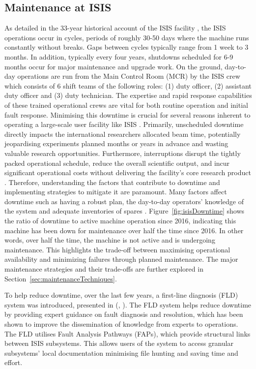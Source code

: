 \documentclass[10pt,oneside]{report}
\renewcommand{\citet}[1]{\citeauthor{#1}, \citeyear{#1}}
\begin{document}
\subsection{Maintenance at ISIS} 
As detailed in the 33-year historical account of the ISIS facility \cite{thomason2019isis}, the ISIS operations occur in cycles, periods of roughly 30-50 days where the machine runs constantly without breaks. Gaps between cycles typically range from 1 week to 3 months. In addition, typically every four years, shutdowns scheduled for 6-9 months occur for major maintenance and upgrade work. On the ground, day-to-day operations are run from the Main Control Room (MCR) by the ISIS crew which consists of 6 shift teams of the following roles: (1) duty officer, (2) assistant duty officer and (3) duty technician. The expertise and rapid response capabilities of these trained operational crews are vital for both routine operation and initial fault response.
Minimising this downtime is crucial for several reasons inherent to operating a large-scale user facility like ISIS \cite{thomason2019isis}. Primarily, unscheduled downtime directly impacts the international researchers allocated beam time, potentially jeopardising experiments planned months or years in advance and wasting valuable research opportunities. Furthermore, interruptions disrupt the tightly packed operational schedule, reduce the overall scientific output, and incur significant operational costs without delivering the facility's core research product \cite{thomason2019isis}. Therefore, understanding the factors that contribute to downtime and implementing strategies to mitigate it are paramount.
Many factors affect downtime such as having a robust plan, the day-to-day operators' knowledge of the system and adequate inventories of spares \cite{thomason2019isis}. Figure~\ref{fig:isisDowntime} shows the ratio of downtime to active machine operation since 2016, indicating this machine has been down for maintenance over half the time since 2016. In other words, over half the time, the machine is not active and is undergoing maintenance. This highlights the trade-off between maximising operational availability and minimizing failures through planned maintenance. The major maintenance strategies and their trade-offs are further explored in Section~\ref{sec:maintenanceTechniques}.

To help reduce downtime, over the last few years, a first-line diagnosis (FLD) system was introduced, presented in (\citet{fld2017}). The FLD system helps reduce downtime by providing expert guidance on fault diagnosis and resolution, which has been shown to improve the dissemination of knowledge from experts to operations. The FLD utilises Fault Analysis Pathways (FAPs), which provide structural links between ISIS subsystems. This allows users of the system to access granular subsystems' local documentation minimising file hunting and saving time and effort. 
\end{document}
